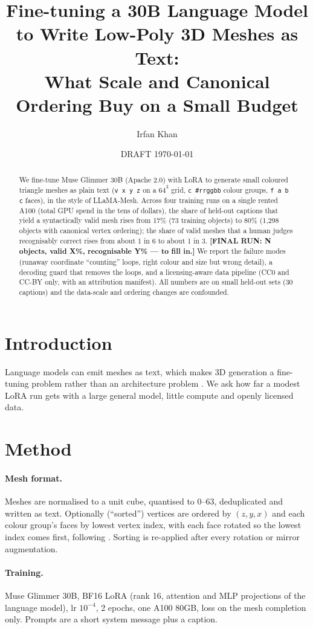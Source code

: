 \documentclass[11pt]{article}
\title{Fine-tuning a 30B Language Model to Write Low-Poly 3D Meshes as Text:\\ What Scale and Canonical Ordering Buy on a Small Budget}
\author{Irfan Khan}
\date{DRAFT \today}
\begin{document}
\maketitle

\begin{abstract}
We fine-tune Muse Glimmer 30B (Apache 2.0) with LoRA to generate small coloured triangle meshes as plain text
(\texttt{v x y z} on a $64^3$ grid, \texttt{c \#rrggbb} colour groups, \texttt{f a b c} faces), in the style of LLaMA-Mesh.
Across four training runs on a single rented A100 (total GPU spend in the tens of dollars), the share of held-out captions that yield a
syntactically valid mesh rises from 17\% (73 training objects) to 80\% (1,298 objects with canonical vertex ordering);
the share of valid meshes that a human judges recognisably correct rises from about 1 in 6 to about 1 in 3.
\textbf{[FINAL RUN: N objects, valid X\%, recognisable Y\% --- to fill in.]}
We report the failure modes (runaway coordinate ``counting'' loops, right colour and size but wrong detail), a decoding
guard that removes the loops, and a licensing-aware data pipeline (CC0 and CC-BY only, with an attribution manifest).
All numbers are on small held-out sets (30 captions) and the data-scale and ordering changes are confounded.
\end{abstract}

\section{Introduction}
Language models can emit meshes as text, which makes 3D generation a fine-tuning problem rather than an architecture
problem \cite{llamamesh}. We ask how far a modest LoRA run gets with a large general model, little compute and openly licensed data.

\section{Method}
\paragraph{Mesh format.} Meshes are normalised to a unit cube, quantised to 0--63, deduplicated and written as text.
Optionally (``sorted'') vertices are ordered by $(z,y,x)$ and each colour group's faces by lowest vertex index, with each face rotated
so the lowest index comes first, following \cite{llamamesh}. Sorting is re-applied after every rotation or mirror augmentation.
\paragraph{Training.} Muse Glimmer 30B, BF16 LoRA (rank 16, attention and MLP projections of the language model), lr $10^{-4}$, 2 epochs,
one A100 80GB, loss on the mesh completion only. Prompts are a short system message plus a caption.
\end{document}
